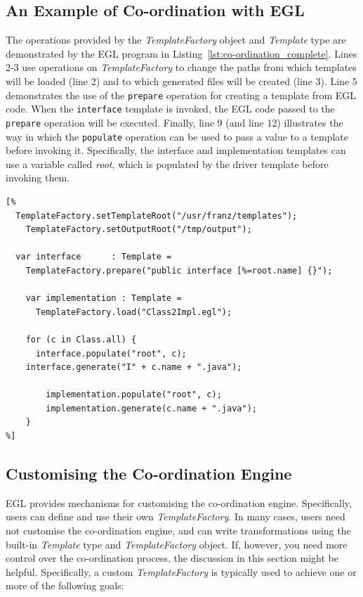 \subsection{An Example of Co-ordination with EGL}
\label{sec:example_of_co-ordination}
The operations provided by the \emph{TemplateFactory} object and \emph{Template} type are demonstrated by the EGL program in Listing~\ref{lst:co-ordination_complete}. Lines 2-3 use operations on \emph{TemplateFactory} to change the paths from which templates will be loaded (line 2) and to which generated files will be created (line 3). Line 5 demonstrates the use of the \texttt{prepare} operation for creating a template from EGL code. When the \texttt{interface} template is invoked, the EGL code passed to the \texttt{prepare} operation will be executed. Finally, line 9 (and line 12) illustrates the way in which the \texttt{populate} operation can be used to pass a value to a template before invoking it. Specifically, the interface and implementation templates can use a variable called \emph{root}, which is populated by the driver template before invoking them.

\begin{lstlisting}[float=tbp, caption=Using the various operations provided by the Template type and TemplateFactory object., label=lst:co-ordination_complete, language=EGL]
[%
  TemplateFactory.setTemplateRoot("/usr/franz/templates");
	TemplateFactory.setOutputRoot("/tmp/output");

  var interface      : Template =
    TemplateFactory.prepare("public interface [%=root.name] {}");
	
	var implementation : Template = 
	  TemplateFactory.load("Class2Impl.egl");

	for (c in Class.all) {
	  interface.populate("root", c);	
  	interface.generate("I" + c.name + ".java");
		
		implementation.populate("root", c);
		implementation.generate(c.name + ".java");
	}
%]
\end{lstlisting}

\subsection{Customising the Co-ordination Engine}
\label{sec:custom_co-ordination}
EGL provides mechanisms for customising the co-ordination engine. Specifically, users can define and use their own \emph{TemplateFactory}. In many cases, users need not customise the co-ordination engine, and can write transformations using the built-in \emph{Template} type and \emph{TemplateFactory} object. If, 
however, you need more control over the co-ordination process, the discussion in this section might be helpful. Specifically, a custom \emph{TemplateFactory} is typically used to achieve one or more of the following goals:


